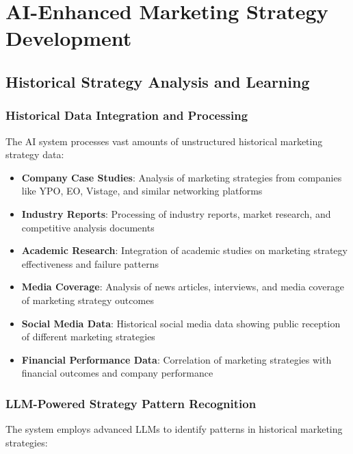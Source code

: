 \section{AI-Enhanced Marketing Strategy Development}

\subsection{Historical Strategy Analysis and Learning}

\subsubsection{Historical Data Integration and Processing}

The AI system processes vast amounts of unstructured historical marketing strategy data:

\begin{itemize}
    \item \textbf{Company Case Studies}: Analysis of marketing strategies from companies like YPO, EO, Vistage, and similar networking platforms
    \item \textbf{Industry Reports}: Processing of industry reports, market research, and competitive analysis documents
    \item \textbf{Academic Research}: Integration of academic studies on marketing strategy effectiveness and failure patterns
    \item \textbf{Media Coverage}: Analysis of news articles, interviews, and media coverage of marketing strategy outcomes
    \item \textbf{Social Media Data}: Historical social media data showing public reception of different marketing strategies
    \item \textbf{Financial Performance Data}: Correlation of marketing strategies with financial outcomes and company performance
\end{itemize}

\subsubsection{LLM-Powered Strategy Pattern Recognition}

The system employs advanced LLMs to identify patterns in historical marketing strategies:

